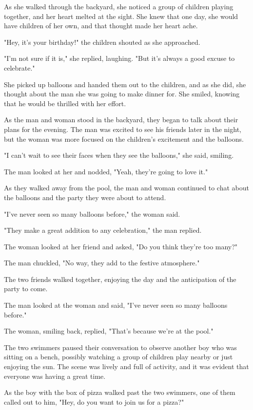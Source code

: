 \documentclass[smalldemyvopaper,11pt,twoside,onecolumn,openright,extrafontsizes]{memoir}
\begin{document}
As she walked through the backyard, she noticed a group of children playing together, and her heart melted at the sight. She knew that one day, she would have children of her own, and that thought made her heart ache.\par
"Hey, it's your birthday!" the children shouted as she approached.\par
"I'm not sure if it is," she replied, laughing. "But it's always a good excuse to celebrate."\par
She picked up balloons and handed them out to the children, and as she did, she thought about the man she was going to make dinner for. She smiled, knowing that he would be thrilled with her effort.\par
As the man and woman stood in the backyard, they began to talk about their plans for the evening. The man was excited to see his friends later in the night, but the woman was more focused on the children's excitement and the balloons.\par
"I can't wait to see their faces when they see the balloons," she said, smiling.\par
The man looked at her and nodded, "Yeah, they're going to love it."\par
As they walked away from the pool, the man and woman continued to chat about the balloons and the party they were about to attend.\par
"I've never seen so many balloons before," the woman said.\par
"They make a great addition to any celebration," the man replied.\par
The woman looked at her friend and asked, "Do you think they're too many?"\par
The man chuckled, "No way, they add to the festive atmosphere."\par
The two friends walked together, enjoying the day and the anticipation of the party to come.\par
The man looked at the woman and said, "I've never seen so many balloons before."\par
The woman, smiling back, replied, "That's because we're at the pool."\par
The two swimmers paused their conversation to observe another boy who was sitting on a bench, possibly watching a group of children play nearby or just enjoying the sun. The scene was lively and full of activity, and it was evident that everyone was having a great time.\par
As the boy with the box of pizza walked past the two swimmers, one of them called out to him, "Hey, do you want to join us for a pizza?"\par
\end{document}

